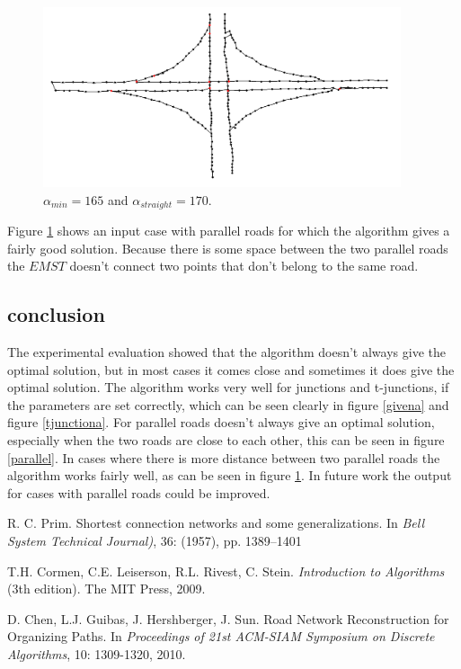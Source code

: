\documentclass[11pt]{article}
\begin{document}
\begin{figure}[h]
  \centering
  \graphicspath{ {images/}}
  \includegraphics[width=\linewidth, height=150pt]{knooppunt167_170}
  \caption{$\alpha_{min}=165$ and $\alpha_{straight}=170$.}
  \label{knooppunt}
\end{figure}

Figure \ref{knooppunt} shows an input case with parallel roads for which the algorithm gives a fairly good solution. Because there is some space between the two parallel roads the $EMST$ doesn't connect two points that don't belong to the same road.

\subsection{conclusion}
The experimental evaluation showed that the algorithm doesn't always give the optimal solution, but in most cases it comes close and sometimes it does give the optimal solution. The algorithm works very well for junctions and t-junctions, if the parameters are set correctly, which can be seen clearly in figure \ref{givena} and figure \ref{tjunctiona}. For parallel roads doesn't always give an optimal solution, especially when the two roads are close to each other, this can be seen in figure \ref{parallel}. In cases where there is more distance between two parallel roads the algorithm works fairly well, as can be seen in figure \ref{knooppunt}. In future work the output for cases with parallel roads could be improved.



\begin{thebibliography}{}

R. C. Prim.
Shortest connection networks and some generalizations.
In \emph{Bell System Technical Journal)}, 36: (1957), pp. 1389–1401

T.H. Cormen, C.E. Leiserson, R.L. Rivest, C. Stein.
\emph{Introduction to Algorithms} (3th edition).
The MIT Press, 2009.

D. Chen, L.J. Guibas, J. Hershberger, J. Sun.
Road Network Reconstruction for Organizing Paths.
In \emph{Proceedings  of  21st  ACM-SIAM  Symposium  on  Discrete  Algorithms}, 10: 1309-1320, 2010.
\end{thebibliography}
\end{document}
